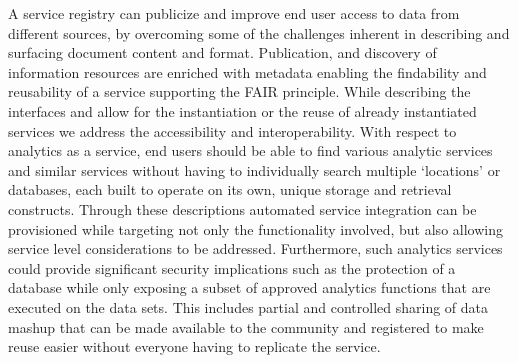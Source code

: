 A service registry can publicize and improve end user access to data
from different sources, by overcoming some of the challenges inherent
in describing and surfacing document content and format. Publication,
and discovery of information resources are enriched with metadata
enabling the findability and reusability of a service supporting the
FAIR principle. While describing the interfaces and allow for the
instantiation or the reuse of already instantiated services we address
the accessibility and interoperability. With respect to analytics as a
service, end users should be able to find various analytic services
and similar services without having to individually search multiple
‘locations’ or databases, each built to operate on its own, unique
storage and retrieval constructs. Through these descriptions automated
service integration can be provisioned while targeting not only the
functionality involved, but also allowing service level considerations
to be addressed. Furthermore, such analytics services could provide
significant security implications such as the protection of a database
while only exposing a subset of approved analytics functions that are
executed on the data sets. This includes partial and controlled
sharing of data mashup that can be made available to the community and
registered to make reuse easier without everyone having to replicate
the service.

